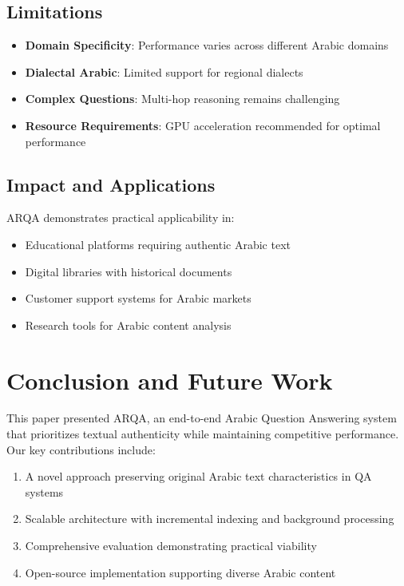 \documentclass[conference]{IEEEtran}
\begin{document}
\subsection{Limitations}
\begin{itemize}
    \item \textbf{Domain Specificity}: Performance varies across different Arabic domains
    \item \textbf{Dialectal Arabic}: Limited support for regional dialects
    \item \textbf{Complex Questions}: Multi-hop reasoning remains challenging
    \item \textbf{Resource Requirements}: GPU acceleration recommended for optimal performance
\end{itemize}

\subsection{Impact and Applications}
ARQA demonstrates practical applicability in:
\begin{itemize}
    \item Educational platforms requiring authentic Arabic text
    \item Digital libraries with historical documents
    \item Customer support systems for Arabic markets
    \item Research tools for Arabic content analysis
\end{itemize}

\section{Conclusion and Future Work}

This paper presented ARQA, an end-to-end Arabic Question Answering system that prioritizes textual authenticity while maintaining competitive performance. Our key contributions include:

\begin{enumerate}
    \item A novel approach preserving original Arabic text characteristics in QA systems
    \item Scalable architecture with incremental indexing and background processing
    \item Comprehensive evaluation demonstrating practical viability
    \item Open-source implementation supporting diverse Arabic content
\end{enumerate}
\end{document}
